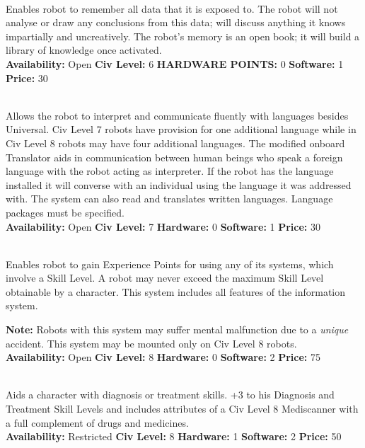 \\
Enables robot to remember all data that it is exposed to.  The robot
will not analyse or draw any conclusions from this data; will discuss
anything it knows impartially and uncreatively. The robot's memory is
an open book; it will build a library of knowledge once activated.
\\
\textbf{Availability:} Open \textbf{Civ Level:} 6 \textbf{HARDWARE
  POINTS:} 0 \textbf{Software:} 1 \textbf{Price:} 30

\\
Allows the robot to interpret and communicate fluently with languages besides Universal. Civ Level 7 robots have provision for one 
additional language while in Civ Level 8 robots may have four additional languages. The modified onboard Translator aids in 
communication between human beings who speak a foreign language with the robot acting as interpreter. If the robot has the language 
installed it will converse with an individual using the language it was addressed with. The system can also read and translates written 
languages. Language packages must be specified. 
\\
\textbf{Availability:} Open \textbf{Civ Level:} 7 \textbf{Hardware:} 0 \textbf{Software:} 1 \textbf{Price:} 30 



 
\\ 
Enables robot to gain Experience Points for using any of its systems, which involve a Skill Level. A robot may never exceed the 
maximum Skill Level obtainable by a character. This system includes all features of the information system. 

\textbf{Note:} Robots with this system may suffer mental malfunction
due to a \emph{unique} accident. This system may be mounted only on
Civ Level 8 robots.
\\
\textbf{Availability:} Open \textbf{Civ Level:} 8 \textbf{Hardware:} 0
\textbf{Software:} 2 \textbf{Price:} 75

\\
Aids a character with diagnosis or treatment skills. +3 to his Diagnosis and Treatment Skill Levels and includes attributes of a Civ Level 
8 Mediscanner with a full complement of drugs and medicines. 
\\
\textbf{Availability:} Restricted \textbf{Civ Level:} 8 \textbf{Hardware:} 1 \textbf{Software:} 2 \textbf{Price:} 50 

